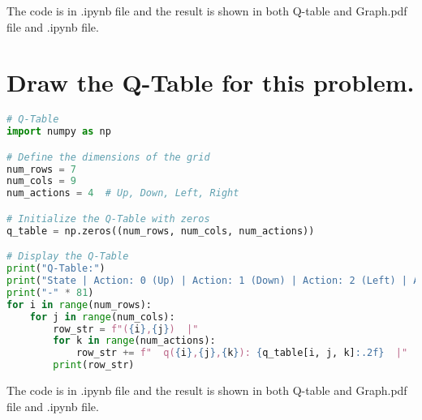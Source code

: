 \documentclass[12pt,onecolumn,a4paper]{article}
\begin{document}
The code is in .ipynb file and the result is shown in both Q-table and Graph.pdf file and .ipynb file.

\section{ Draw the Q-Table for this problem.}
\begin{lstlisting}[language=Python]
# Q-Table
import numpy as np

# Define the dimensions of the grid
num_rows = 7
num_cols = 9
num_actions = 4  # Up, Down, Left, Right

# Initialize the Q-Table with zeros
q_table = np.zeros((num_rows, num_cols, num_actions))

# Display the Q-Table
print("Q-Table:")
print("State | Action: 0 (Up) | Action: 1 (Down) | Action: 2 (Left) | Action: 3 (Right)")
print("-" * 81)
for i in range(num_rows):
    for j in range(num_cols):
        row_str = f"({i},{j})  |"
        for k in range(num_actions):
            row_str += f"  q({i},{j},{k}): {q_table[i, j, k]:.2f}  |"
        print(row_str)
\end{lstlisting}

The code is in .ipynb file and the result is shown in both Q-table and Graph.pdf file and .ipynb file.
\end{document}
